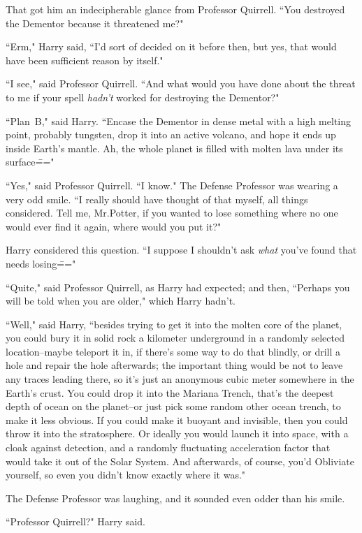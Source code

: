 That got him an indecipherable glance from Professor Quirrell. ``You destroyed the Dementor because it threatened me?"

``Erm," Harry said, ``I'd sort of decided on it before then, but yes, that would have been sufficient reason by itself."

``I see," said Professor Quirrell. ``And what would you have done about the threat to me if your spell \emph{hadn't} worked for destroying the Dementor?"

``Plan~B," said Harry. ``Encase the Dementor in dense metal with a high melting point, probably tungsten, drop it into an active volcano, and hope it ends up inside Earth's mantle. Ah, the whole planet is filled with molten lava under its surface\==="

``Yes," said Professor Quirrell. ``I know." The Defense Professor was wearing a very odd smile. ``I really should have thought of that myself, all things considered. Tell me, Mr.\?Potter, if you wanted to lose something where no one would ever find it again, where would you put it?"

Harry considered this question. ``I suppose I shouldn't ask \emph{what} you've found that needs losing\==="

``Quite," said Professor Quirrell, as Harry had expected; and then, ``Perhaps you will be told when you are older," which Harry hadn't.

``Well," said Harry, ``besides trying to get it into the molten core of the planet, you could bury it in solid rock a kilometer underground in a randomly selected location\---maybe teleport it in, if there's some way to do that blindly, or drill a hole and repair the hole afterwards; the important thing would be not to leave any traces leading there, so it's just an anonymous cubic meter somewhere in the Earth's crust. You could drop it into the Mariana Trench, that's the deepest depth of ocean on the planet\---or just pick some random other ocean trench, to make it less obvious. If you could make it buoyant and invisible, then you could throw it into the stratosphere. Or ideally you would launch it into space, with a cloak against detection, and a randomly fluctuating acceleration factor that would take it out of the Solar System. And afterwards, of course, you'd Obliviate yourself, so even you didn't know exactly where it was."

The Defense Professor was laughing, and it sounded even odder than his smile.

``Professor Quirrell?" Harry said.

